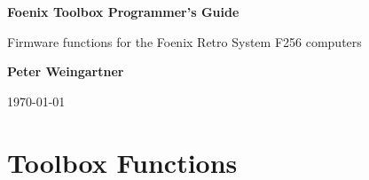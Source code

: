 \documentclass[10pt]{book}
\begin{document}
\lstset{language=C,basicstyle=\small,showstringspaces=false,columns=fullflexible,stringstyle=\ttfamily}

\begin{titlepage}
	\begin{center}
		\vspace*{1cm}
 
		\textbf{\Large Foenix Toolbox Programmer's Guide}
 
		\vspace{0.5cm}
		
		Firmware functions for the Foenix Retro System F256 computers
			 
		\vspace{1.5cm}
 
		\textbf{Peter Weingartner}
 
		\vfill
	  
		\today
			 
	\end{center}
\end{titlepage}

\tableofcontents




\chapter{Toolbox Functions}






\end{document}
